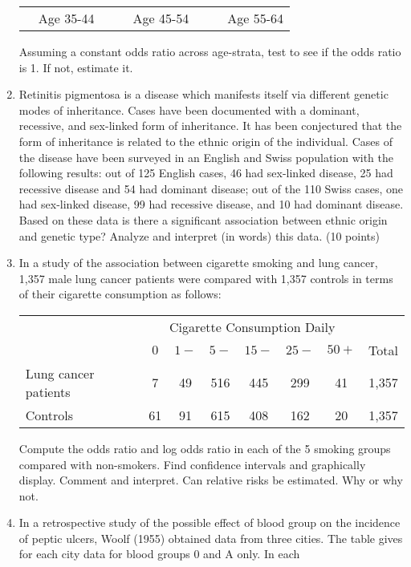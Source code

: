 \documentclass[12pt]{article}
\begin{document}
\begin{enumerate}[Problem 1.]
\begin{center}
\begin{tabular}{lllclllclll}
& \multicolumn{2}{c}{Age 35-44} &&& \multicolumn{2}{c}{Age 45-54}
&&& \multicolumn{2}{c}{Age 55-64}
\end{tabular}
\end{center}
Assuming a constant odds ratio across age-strata, test to see if the
odds ratio is 1.  If not, estimate it.
\item Retinitis pigmentosa is a disease which manifests itself via
  different genetic modes of inheritance.  Cases have been documented
  with a dominant, recessive, and sex-linked form of inheritance.  It
  has been conjectured that the form of inheritance is related to the
  ethnic origin of the individual.  Cases of the disease have been
  surveyed in an English and Swiss population with the following
  results: out of 125 English cases, 46 had sex-linked disease, 25 had
  recessive disease and 54 had dominant disease; out of the 110 Swiss
  cases, one had sex-linked disease, 99 had recessive disease, and 10
  had dominant disease.  Based on these data is there a significant
  association between ethnic origin and genetic type?  Analyze and
  interpret (in words) this data. (10 points)
\item In a study of the association between cigarette smoking and lung
  cancer, 1,357 male lung cancer patients were compared with 1,357
  controls in terms of their cigarette consumption as follows:
\begin{center}
\begin{tabular}{lccccccc} \hline
& \multicolumn{6}{c}{Cigarette Consumption Daily} & \\
& $0$ & $1-$ & $5-$ & $15-$ & $25-$ & $50+$ & Total \\ \hline
Lung cancer patients & 7 & 49 & 516 & 445 & 299 & 41 & 1,357 \vspace{+0.10in}
\\
Controls & 61 & 91 & 615 & 408 & 162 & 20 & 1,357  \vspace{+0.05in} \\
\hline
\end{tabular}
\end{center}
Compute the odds ratio and log odds ratio in each of the 5 smoking groups
compared with non-smokers.  Find confidence intervals and graphically
display. Comment and interpret.  Can relative risks be estimated.  Why or
why not.
\item In a retrospective study of the possible effect of blood group on the
incidence of peptic ulcers, Woolf (1955) obtained data from three cities.
The table gives for each city data for blood groups 0 and A only.  In each

\end{enumerate}
\end{document}
